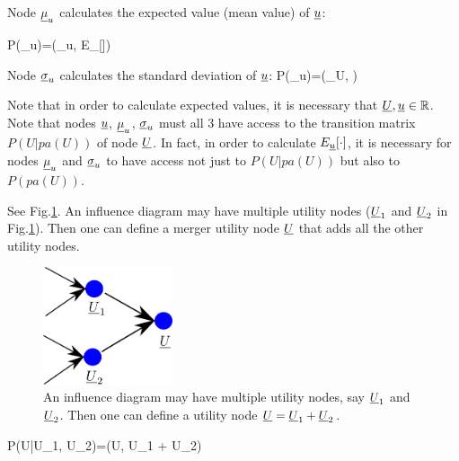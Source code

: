 Node $\underline{\mu}_u$
calculates the
expected value (mean value) of ${\underline{u}}$:

\beq\color{blue}
P(\mu_u)=\delta(\mu_u,
E_{\rvu}[\rvu])
\eeq

Node $\underline{\sigma}_u$
calculates the
standard deviation of ${\underline{u}}$:
\beq\color{blue}
P(\sigma_u)=\delta(\sigma_U,
)
\eeq

Note that in order to
calculate expected values,
it is necessary that
${\underline{U}}, {\underline{u}}\in { \mathbb{R}}$. Note that
nodes ${\underline{u}}$, $\underline{\mu}_u$, $\underline{\sigma}_u$
must all 3 have access
to the 
transition matrix
$P(U|pa(U))$ of node ${\underline{U}}$.
In fact, in order  to
calculate $E_{\underline{u}}[\cdot]$,
it is necessary for
nodes $\underline{\mu}_u$ and 
 $\underline{\sigma}_u$
to have access not just to 
$P(U|pa(U))$ but also to
$P(pa(U))$.

See Fig.\ref{fig-util-merge}.
An influence
diagram may have multiple
utility nodes (${\underline{U}}_1$ and
${\underline{U}}_2$ in Fig.\ref{fig-util-merge}).
Then one can define a merger
utility node ${\underline{U}}$ that adds
all the other utility 
nodes.

\begin{figure}[h!]
\centering
\includegraphics[width=1.5in]
{dtree/util-merge.png}
\caption{An influence
diagram may have multiple
utility nodes, say ${\underline{U}}_1$ and
${\underline{U}}_2$. Then
one can define a
utility node ${\underline{U}}={\underline{U}}_1 + {\underline{U}}_2$. } 
\label{fig-util-merge}
\end{figure}

\beq\color{blue}
P(U|U_1, U_2)=\delta(U,
U_1 + U_2)
\eeq